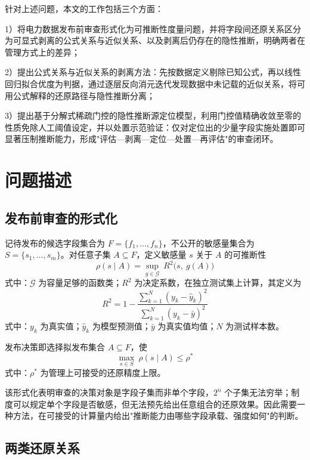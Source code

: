 \documentclass[UTF8,zihao=5,twoside,fontset=none]{ctexart}
\begin{document}
针对上述问题，本文的工作包括三个方面：

1）将电力数据发布前审查形式化为可推断性度量问题，并将字段间还原关系区分为可显式剥离的公式关系与近似关系、以及剥离后仍存在的隐性推断，明确两者在管理方式上的差异；

2）提出公式关系与近似关系的剥离方法：先按数据定义剔除已知公式，再以线性回归拟合优度为判据，通过逐层反向消元迭代发现数据中未记载的近似关系，将可用公式解释的还原路径与隐性推断分离；

3）提出基于分解式稀疏门控的隐性推断源定位模型，利用门控值精确收敛至零的性质免除人工阈值设定，并以处置示范验证：仅对定位出的少量字段实施处置即可显著压制推断能力，形成"评估—剥离—定位—处置—再评估"的审查闭环。

\section{问题描述}

\subsection{发布前审查的形式化}

记待发布的候选字段集合为 $F=\{f_1,\dots,f_n\}$，不公开的敏感量集合为 $S=\{s_1,\dots,s_m\}$。对任意子集 $A\subseteq F$，定义敏感量 $s$ 关于 $A$ 的可推断性
\begin{equation}
\rho(s\mid A)=\sup_{g\in\mathcal{G}}\ R^2\big(s,\ g(A)\big)
\end{equation}
式中：$\mathcal{G}$ 为容量足够的函数类；$R^2$ 为决定系数，在独立测试集上计算，其定义为
\begin{equation}
R^2=1-\frac{\sum_{k=1}^{N}(y_k-\hat y_k)^2}{\sum_{k=1}^{N}(y_k-\bar y)^2}
\end{equation}
式中：$y_k$ 为真实值；$\hat y_k$ 为模型预测值；$\bar y$ 为真实值均值；$N$ 为测试样本数。

发布决策即选择拟发布集合 $A\subseteq F$，使
\begin{equation}
\max_{s\in S}\ \rho(s\mid A)\le \rho^{\ast}
\end{equation}
式中：$\rho^{\ast}$ 为管理上可接受的还原精度上限。

该形式化表明审查的决策对象是字段子集而非单个字段，$2^n$ 个子集无法穷举；制度可以规定单个字段是否敏感，但无法预先给出任意组合的还原效果。因此需要一种方法，在可接受的计算量内给出"推断能力由哪些字段承载、强度如何"的判断。

\subsection{两类还原关系}
\end{document}
